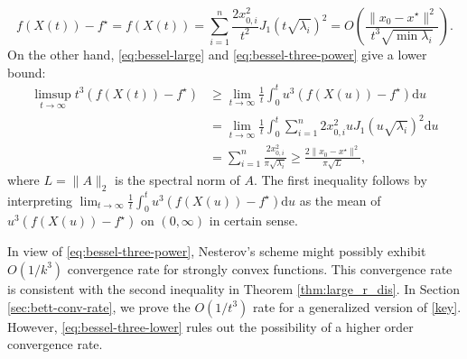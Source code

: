 \documentclass[twoside,11pt]{article}
\newcommand{\norm}[1]{\|#1\|}
\newcommand{\goto}{\rightarrow}
\renewcommand{\d}{{\mathrm{d}}}
\def\N{Nesterov's scheme }
\begin{document}
\begin{equation}\label{eq:bessel-three-power}
f(X(t))-f^\star = f(X(t)) = \sum_{i=1}^n\frac{2x_{0,i}^2}{t^2}J_1\left( t\sqrt{\lambda_i} \right)^2 = O\left(\frac{\|x_0 - x^\star\|^2}{t^3\sqrt{\min\lambda_i}}\right).
\end{equation}
On the other hand, \eqref{eq:bessel-large} and \eqref{eq:bessel-three-power} give a lower bound:
\begin{equation}\label{eq:bessel-three-lower}
\begin{aligned}
\limsup_{t\rightarrow\infty}t^3(f(X(t)) - f^\star) &\ge \lim_{t\goto\infty}\frac{1}{t} \int_0^t u^3(f(X(u)) - f^\star) \d u\\ &=\lim_{t\goto\infty}\frac{1}{t}\int_{0}^t\sum_{i=1}^n2x_{0,i}^2uJ_1(u\sqrt{\lambda_i})^2 \d u \\
&= \sum_{i=1}^n\frac{2x_{0,i}^2}{\pi\sqrt{\lambda_i}} \geq \frac{2\norm{x_0 - x^\star}^2}{\pi\sqrt{L}},
\end{aligned}
\end{equation}
where $L = \|A\|_2$ is the spectral norm of $A$. The first inequality follows by interpreting $\lim_{t\goto\infty}\frac{1}{t} \int_0^t u^3(f(X(u)) - f^\star) \d u$ as the mean of $u^3(f(X(u)) - f^\star)$ on $(0, \infty)$ in certain sense.

In view of \eqref{eq:bessel-three-power}, \N might possibly exhibit $O(1/k^3)$ convergence rate for strongly convex functions. This convergence rate is consistent with the second inequality in Theorem \ref{thm:large_r_dis}. In Section \ref{sec:bett-conv-rate}, we prove the $O(1/t^3)$ rate for a generalized version of \eqref{key}. However, \eqref{eq:bessel-three-lower} rules out the possibility of a higher order convergence rate.

\end{document}
